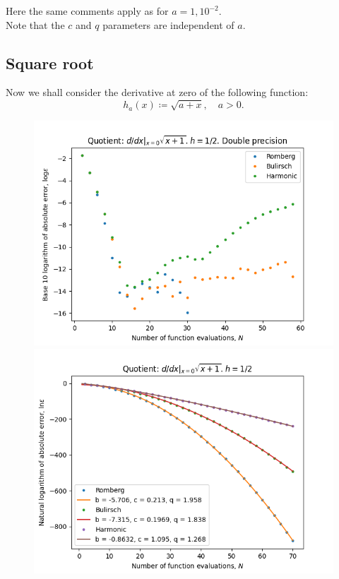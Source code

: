 Here the same comments apply as for \(a= 1,10^{-2}\).\\

Note that the \(c\) and \(q\) parameters are independent of \(a\).

\subsection{Square root}

Now we shall consider the derivative at zero of the following function:
\[
h_a(x) \coloneqq \sqrt{a + x}, \quad a > 0.
\]

\begin{figure}[H]
\centering
\begin{minipage}{0.45\textwidth}
\centering
\includegraphics[scale=0.45]{diff_quot_plots/sqrt_1.png}
\end{minipage}
\begin{minipage}{0.45\textwidth}
\centering
\includegraphics[scale=0.45]{diff_quot_plots/sqrt_1_hp_trend.png}
\end{minipage}
\end{figure}

